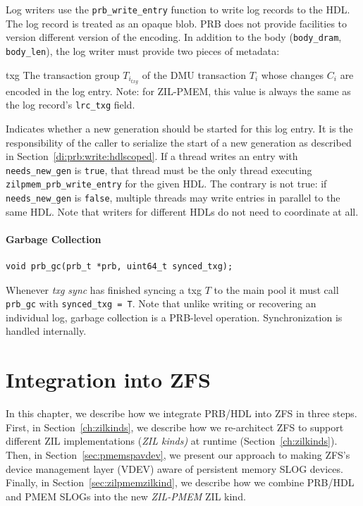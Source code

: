 \documentclass[12pt,a4paper,twoside]{book}
\begin{document}
{Log writers use the \lstinline{prb_write_entry} function to write log records to the HDL.
The log record is treated as an opaque blob.
PRB does not provide facilities to version different version of the encoding.
In addition to the body (\lstinline{body_dram}, \lstinline{body_len}), the log writer must provide two pieces of metadata:
\begin{description}[noitemsep,leftmargin=1.5cm,labelindent=1cm]
    \item[txg] The transaction group $T_{i_{txg}}$ of the DMU transaction $T_i$ whose changes $C_i$ are encoded in the log entry.
        Note: for ZIL-PMEM, this value is always the same as the log record's \lstinline{lrc_txg} field.
    \item[needs\_new\_gen] Indicates whether a new generation should be started for this log entry.
        It is the responsibility of the caller to serialize the start of a new generation as described in Section~\ref{di:prb:write:hdlscoped}.
        If a thread writes an entry with \lstinline{needs_new_gen} is \lstinline{true}, that thread must be the only thread executing \lstinline{zilpmem_prb_write_entry} for the given HDL.
        The contrary is not true: if \lstinline{needs_new_gen} is \lstinline{false}, multiple threads may write entries in parallel to the same HDL.
        Note that writers for different HDLs do not need to coordinate at all.
\end{description}

\subsubsection{Garbage Collection}

\begin{lstlisting}
void prb_gc(prb_t *prb, uint64_t synced_txg);
\end{lstlisting}

Whenever \textit{txg sync} has finished syncing a txg $T$ to the main pool it must call \lstinline{prb_gc} with \lstinline{synced_txg = T}.
Note that unlike writing or recovering an individual log, garbage collection is a PRB-level operation.
Synchronization is handled internally.


\chapter{Integration into ZFS}\label{ch:zilpmem}
In this chapter, we describe how we integrate PRB/HDL into ZFS in three steps.
First, in Section~\ref{ch:zilkinds}, we describe how we re-architect ZFS to support different ZIL implementations (\textit{ZIL kinds)} at runtime (Section~\ref{ch:zilkinds}).
Then, in Section~\ref{sec:pmemspavdev}, we present our approach to making ZFS's device management layer (VDEV) aware of persistent memory SLOG devices.
Finally, in Section~\ref{sec:zilpmemzilkind}, we describe how we combine PRB/HDL and PMEM SLOGs into the new \textit{ZIL-PMEM} ZIL kind.

}
\end{document}
